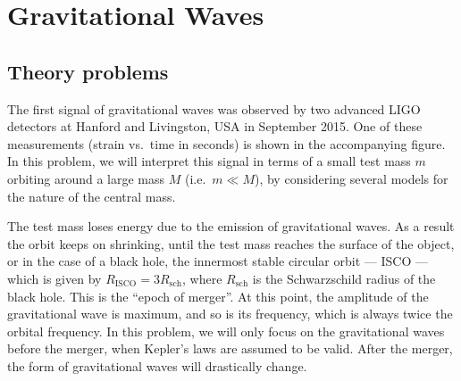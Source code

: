 \chapter{Gravitational Waves}

\section*{Theory problems}

The first signal of gravitational waves was observed by two advanced LIGO
detectors at Hanford and Livingston, USA in September 2015. One of these
measurements (strain vs.\ time in seconds) is shown in the accompanying figure.
In this problem, we will interpret this signal in terms of a small test mass $m$
orbiting around a large mass $M$ (i.e.\ $m \ll M$), by considering several
models for the nature of the central mass.


The test mass loses energy due to the emission of gravitational waves. As a
result the orbit keeps on shrinking, until the test mass reaches the surface of
the object, or in the case of a black hole, the innermost stable circular orbit
--- ISCO --- which is given by $R_{\mathrm{ISCO}} = 3R_{\mathrm{sch}}$, where
$R_{\mathrm{sch}}$ is the Schwarzschild radius of the black hole. This is the
``epoch of merger''. At this point, the amplitude of the gravitational wave is
maximum, and so is its frequency, which is always twice the orbital frequency.
In this problem, we will only focus on the gravitational waves before the
merger, when Kepler's laws are assumed to be valid. After the merger, the form
of gravitational waves will drastically change.

